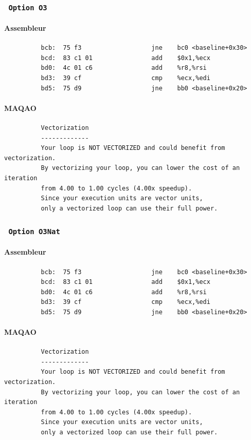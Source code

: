 \documentclass{report}
\begin{document}
      \subsubsection{ \texttt{ Option O3 }  }
      \paragraph{Assembleur}
        \begin{verbatim}
          bcb:	75 f3                	jne    bc0 <baseline+0x30>
          bcd:	83 c1 01             	add    $0x1,%ecx
          bd0:	4c 01 c6             	add    %r8,%rsi
          bd3:	39 cf                	cmp    %ecx,%edi
          bd5:	75 d9                	jne    bb0 <baseline+0x20>
        \end{verbatim}
      \paragraph{MAQAO}
        \begin{verbatim}
          Vectorization
          -------------
          Your loop is NOT VECTORIZED and could benefit from vectorization.
          By vectorizing your loop, you can lower the cost of an iteration
          from 4.00 to 1.00 cycles (4.00x speedup).
          Since your execution units are vector units,
          only a vectorized loop can use their full power.
        \end{verbatim}
      \subsubsection{ \texttt{ Option O3Nat} }
      \paragraph{Assembleur}
        \begin{verbatim}
          bcb:	75 f3                	jne    bc0 <baseline+0x30>
          bcd:	83 c1 01             	add    $0x1,%ecx
          bd0:	4c 01 c6             	add    %r8,%rsi
          bd3:	39 cf                	cmp    %ecx,%edi
          bd5:	75 d9                	jne    bb0 <baseline+0x20>
        \end{verbatim}
      \paragraph{MAQAO}
        \begin{verbatim}
          Vectorization
          -------------
          Your loop is NOT VECTORIZED and could benefit from vectorization.
          By vectorizing your loop, you can lower the cost of an iteration
          from 4.00 to 1.00 cycles (4.00x speedup).
          Since your execution units are vector units,
          only a vectorized loop can use their full power.
        \end{verbatim}
\end{document}
